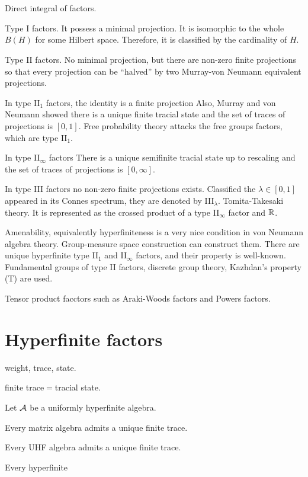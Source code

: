 \documentclass{../note}
\begin{document}
\section{}


Direct integral of factors.

Type I factors.
It possess a minimal projection.
It is isomorphic to the whole $B(H)$ for some Hilbert space.
Therefore, it is classified by the cardinality of $H$.

Type II factors.
No minimal projection, but there are non-zero finite projections so that every projection can be ``halved'' by two Murray-von Neumann equivalent projections.

In type II$_1$ factors, the identity is a finite projection
Also, Murray and von Neumann showed there is a unique finite tracial state and the set of traces of projections is $[0,1]$.
Free probability theory attacks the free groups factors, which are type II$_1$.

In type II$_\infty$ factors
There is a unique semifinite tracial state up to rescaling and the set of traces of projections is $[0,\infty]$.

In type III factors no non-zero finite projections exists.
Classified the $\lambda\in[0,1]$ appeared in its Connes spectrum, they are denoted by III$_\lambda$.
Tomita-Takesaki theory.
It is represented as the crossed product of a type II$_\infty$ factor and $\mathbb{R}$.

Amenability, equivalently hyperfiniteness is a very nice condition in von Neumann algebra theory.
Group-measure space construction can construct them.
There are unique hyperfinite type II$_1$ and II$_\infty$ factors, and their property is well-known.
Fundamental groups of type II factors, discrete group theory, Kazhdan's property (T) are used.


Tensor product facctors such as Araki-Woods factors and Powers factors.

\section{Hyperfinite factors}

weight, trace, state.

finite trace$=$tracial state.

\begin{prb}
Let $\mathcal{A}$ be a uniformly hyperfinite algebra.
\begin{parts}
\item Every matrix algebra admits a unique finite trace.
\item Every UHF algebra admits a unique finite trace.
\item Every hyperfinite 
\end{parts}
\end{prb}
\end{document}
